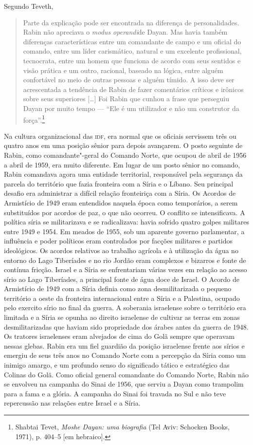 Segundo Teveth,

\begin{quote}
Parte da explicação pode ser encontrada na diferença de personalidades.
Rabin não apreciava o \textit{modus operandi}de Dayan. Mas havia também
diferenças características entre um comandante de campo e um oficial do
comando, entre um líder carismático, natural e um excelente
profissional, tecnocrata, entre um homem que funciona de acordo com seus
sentidos e visão prática e um outro, racional, baseado na lógica, entre
alguém confortável no meio de outras pessoas e alguém tímido. A isso
deve ser acrescentada a tendência de Rabin de fazer comentários críticos
e irônicos sobre seus superiores {[}\ldots{}{]} Foi Rabin que cunhou a frase
que perseguiu Dayan por muito tempo --- ``Ele é um utilizador e não um
construtor da força''.\footnote{Shabtai Tevet, \textit{Moshe Dayan: uma biografia} (Tel Aviv: Schocken Books,
1971), p. 404--5 {[}em hebraico{]}.}
\end{quote}

Na cultura organizacional das \textsc{idf}, era normal que os oficiais servissem
três ou quatro anos em uma posição sênior para depois avançarem. O posto
seguinte de Rabin, como comandante"-geral do Comando Norte, que ocupou de
abril de 1956 a abril de 1959, era muito diferente. Em lugar de um posto
sênior no comando, Rabin comandava agora uma entidade territorial,
responsável pela segurança da parcela do território que fazia fronteira
com a Síria e o Líbano. Seu principal desafio era administrar a difícil
relação fronteiriça com a Síria. Os Acordos de Armistício de 1949 eram
entendidos naquela época como temporários, a serem substituídos por
acordos de paz, o que não ocorreu. O conflito se intensificava. A
política síria se militarizava e se radicalizava: havia sofrido quatro
golpes militares entre 1949 e 1954. Em meados de 1955, sob um aparente
governo parlamentar, a influência e poder políticos eram controlados por
facções militares e partidos ideológicos. Os acordos relativos ao
trabalho agrícola e à utilização da água no entorno do Lago Tiberíades e
no rio Jordão eram complexos e bizarros e fonte de contínua fricção.
Israel e a Síria se enfrentariam várias vezes em relação ao acesso sírio
ao Lago Tiberíades, a principal fonte de água doce de Israel. O Acordo
de Armistício de 1949 com a Síria definia como zona desmilitarizada o
pequeno território a oeste da fronteira internacional entre a Síria e a
Palestina, ocupado pelo exercito sírio no final da guerra. A soberania
israelense sobre o território era limitada e a Síria se opunha ao
direito israelense de cultivar as terras em zonas desmilitarizadas que
haviam sido propriedade dos árabes antes da guerra de 1948. Os tratores
israelenses eram alvejados de cima do Golã sempre que operavam
nessas glebas. Rabin era um fiel guardião da posição israelense frente
aos sírios e emergiu de seus três anos no Comando Norte com a percepção
da Síria como um inimigo amargo, e um profundo senso do significado
tático e estratégico das Colinas do Golã. Como oficial general
comandante do Comando Norte, Rabin não se envolveu na campanha do Sinai
de 1956, que serviu a Dayan como trampolim para a fama e a glória. A
campanha do Sinai foi travada no Sul e não teve repercussão nas relações
entre Israel e a Síria.

